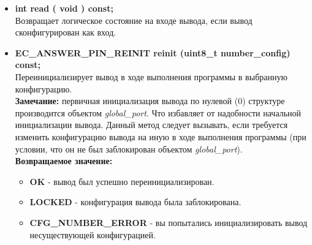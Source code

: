 \begin{itemize}
	\item \textbf{int		read	( void ) const;}\\Возвращает логическое состояние на входе вывода, если вывод сконфигурирован как вход.
	\item \textbf{EC\_ANSWER\_PIN\_REINIT	reinit	(uint8\_t number\_config) const;}\\Переинициализирует вывод в ходе выполнения программы в выбранную конфигурацию.\\\textbf{Замечание: }первичная инициализация вывода по нулевой (0) структуре производится объектом \textit{global\_port}. Что избавляет от надобности начальной инициализации вывода. Данный метод следует вызывать, если требуется изменить конфигурацию вывода на иную в ходе выполнения программы (при условии, что он не был заблокирован объектом \textit{global\_port}).\\\textbf{Возвращаемое значение:}
	\begin{itemize}
		\item \textbf{OK} - вывод был успешно переинициализирован.
		\item \textbf{LOCKED} - конфигурация вывода была заблокирована.
		\item \textbf{CFG\_NUMBER\_ERROR} - вы попытались инициализировать вывод несуществующей конфигурацией.
	\end{itemize}
\end{itemize}